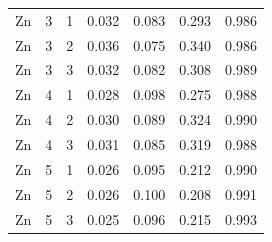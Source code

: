 \documentclass[ms, hidelinks]{uncgdissertationexp3}
\theoremstyle{plain}
\theoremstyle{definition}
\theoremstyle{remark}
\begin{document}
\begin{longtable}{ccccccc}
  Zn & 3 & 1 & 0.032 & 0.083 & 0.293 & 0.986\\
  \rowcolor{gray!6}  Zn & 3 & 2 & 0.036 & 0.075 & 0.340 & 0.986\\
  Zn & 3 & 3 & 0.032 & 0.082 & 0.308 & 0.989\\
  \rowcolor{gray!6}  Zn & 4 & 1 & 0.028 & 0.098 & 0.275 & 0.988\\
  Zn & 4 & 2 & 0.030 & 0.089 & 0.324 & 0.990\\
  \rowcolor{gray!6}  Zn & 4 & 3 & 0.031 & 0.085 & 0.319 & 0.988\\
  Zn & 5 & 1 & 0.026 & 0.095 & 0.212 & 0.990\\
  \rowcolor{gray!6}  Zn & 5 & 2 & 0.026 & 0.100 & 0.208 & 0.991\\
  Zn & 5 & 3 & 0.025 & 0.096 & 0.215 & 0.993\\*
  \end{longtable}
  \clearpage
\end{document}
